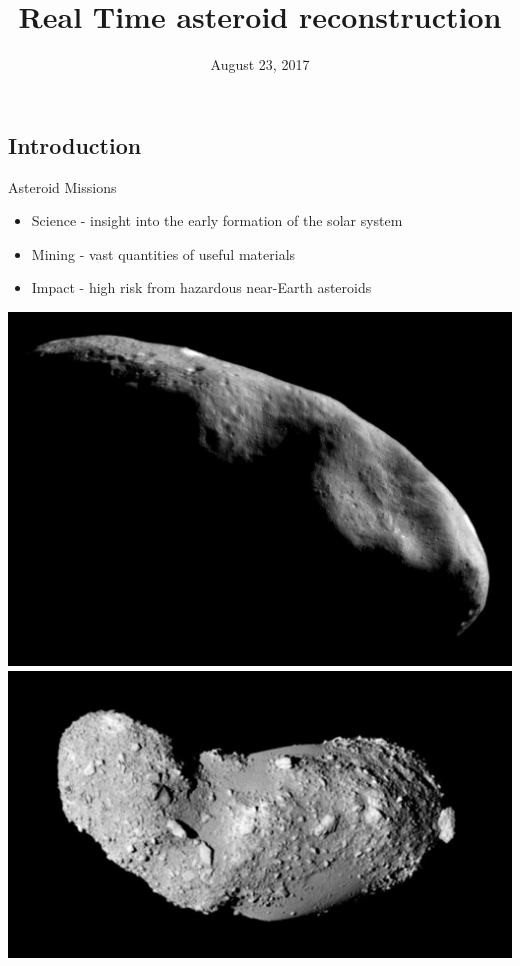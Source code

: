 \documentclass[11pt,professionalfonts]{beamer}
\title[Asteroid Reconstruction]{\large\textbf Real Time asteroid reconstruction}
\author{\vspace*{-0.3cm}}
\institute{
	\footnotesize
	{\normalsize\bf{Shankar Kulumani, Kuya Takami \\ Taeyoung Lee}}\\
	\vspace*{0.2cm}
  	\textbf{Department of Mechanical \& Aerospace Engineering}\\ \vspace*{0.5cm}
 	\begin{figure} %
       	\texttt{[image: gw\_txh\_2cs\_pos]}
  	\end{figure}
}
\date{August 23, 2017}
\begin{document}

\setcounter{framenumber}{-1}
\begin{frame} %
  \titlepage
\end{frame}   %

\section*{}
\subsection*{Introduction}  
\begin{frame}{Asteroid Missions}
\begin{itemize}
    \item Science - insight into the early formation of the solar system
    \item Mining - vast quantities of useful materials
    \item Impact - high risk from hazardous near-Earth asteroids
\end{itemize}    

\begin{center}
    \includegraphics[height=0.35\textheight]{figures/near_mos_20001203_full.jpg}
    \hfill
    \includegraphics[height=0.35\textheight]{figures/Itokawa8_hayabusa_1210.jpg}
\end{center}
\end{frame}
\end{document}
